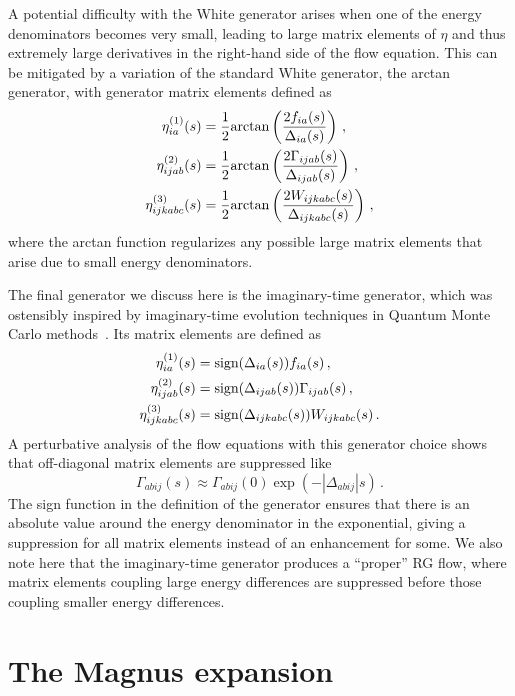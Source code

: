 A potential difficulty with the White generator arises
when one of the energy denominators becomes very small,
leading to large matrix elements of $\eta$
and thus extremely large derivatives in the right-hand side of the flow equation.
This can be mitigated by a variation of the standard White generator,
the arctan generator,
with generator matrix elements defined as
\begin{align}
  \eta^{(1)}_{ia}(s)       & = \frac{1}{2}\text{arctan}\left(\frac{2f_{ia}(s)}{\Delta_{ia}(s)}\right)\,,          \\
  \eta^{(2)}_{ijab}(s)     & = \frac{1}{2}\text{arctan}\left(\frac{2\Gamma_{ijab}(s)}{\Delta_{ijab}(s)}\right)\,, \\
  \eta^{(3)}_{ijkabc}(s) & = \frac{1}{2}\text{arctan}\left(\frac{2W_{ijkabc}(s)}{\Delta_{ijkabc}(s)}\right)\,,
\end{align}
where the arctan function regularizes any possible large matrix elements that arise due to small energy denominators.

The final generator we discuss here is the imaginary-time generator,
which was ostensibly inspired by imaginary-time evolution techniques
in Quantum Monte Carlo methods~\cite{Herg15imsrgphysrep}.
Its matrix elements are defined as
\begin{align}
  \eta^{(1)}_{ia}(s)       & = \text{sign}(\Delta_{ia}(s))f_{ia}(s)\,,          \\
  \eta^{(2)}_{ijab}(s)     & = \text{sign}(\Delta_{ijab}(s))\Gamma_{ijab}(s)\,, \\
  \eta^{(3)}_{ijkabc}(s) & = \text{sign}(\Delta_{ijkabc}(s))W_{ijkabc}(s)\,.
\end{align}
A perturbative analysis of the flow equations with this generator choice shows
that off-diagonal matrix elements are suppressed like
\begin{equation}
  \Gamma_{abij}(s) \approx \Gamma_{abij}(0) \exp(-|\Delta_{abij}|s)\,.
\end{equation}
The sign function in the definition of the generator ensures that
there is an absolute value around the energy denominator in the exponential,
giving a suppression for all matrix elements instead of an enhancement for some.
We also note here that the imaginary-time generator produces a ``proper'' RG flow,
where matrix elements coupling large energy differences are suppressed
before those coupling smaller energy differences.

\section{The Magnus expansion}\label{sec:imsrg_magnus}

